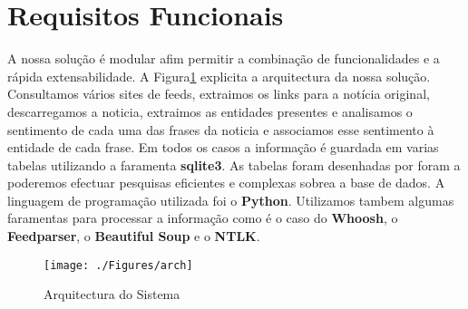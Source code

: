 \section{Requisitos Funcionais}
\hspace{15pt}A nossa solução é modular afim permitir a combinação de funcionalidades e a rápida extensabilidade. A Figura\ref{fig:arch} explicita a arquitectura da nossa solução. Consultamos vários sites de feeds, extraimos os links para a notícia original, descarregamos a noticia, extraimos as entidades presentes e analisamos o sentimento de cada uma das frases da noticia e associamos esse sentimento à entidade de cada frase. Em todos os casos a informação é guardada em varias tabelas utilizando a faramenta \textbf{sqlite3}. As tabelas foram desenhadas por foram a poderemos efectuar pesquisas eficientes e complexas sobrea a base de dados. A linguagem de programação utilizada foi o \textbf{Python}. Utilizamos tambem algumas faramentas para processar a informação como é o caso do \textbf{Whoosh}, o \textbf{Feedparser}, o \textbf{Beautiful Soup} e o \textbf{NTLK}.
\begin{figure}[ht!]
\centering
\texttt{[image: ./Figures/arch]}
\caption{Arquitectura do Sistema}
\label{fig:arch}
\end{figure}
